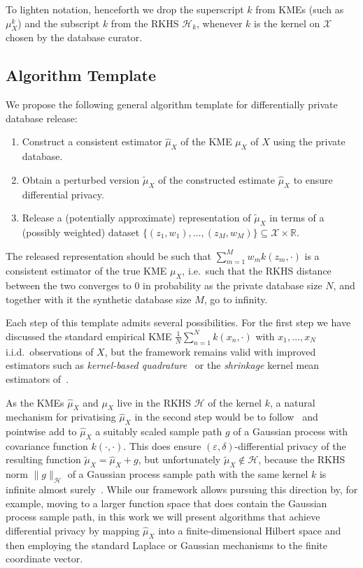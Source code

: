 \documentclass{article}
\newcommand{\calH}{\mathcal{H}}			%
\newcommand{\calX}{\mathcal{X}}			%
\newcommand{\IR}{\mathbb{R}}  			%
\theoremstyle{plain}
\theoremstyle{remark}
\theoremstyle{definition}
\begin{document}
To lighten notation, henceforth we drop the superscript $k$ from KMEs (such as $\mu_X^k$) and the subscript $k$ from the RKHS $\calH_k$, whenever $k$ is the kernel on $\calX$ chosen by the database curator.


\subsection{Algorithm Template}
\label{sec:framework:template}

We propose the following general algorithm template for differentially private database release:
\begin{enumerate}
	\item Construct a consistent estimator $\hat{\mu}_X$ of the KME $\mu_X$ of $X$ using the private database.
	\item Obtain a perturbed version $\tilde{\mu}_X$ of the constructed estimate $\hat{\mu}_X$ to ensure differential privacy.
	\item Release a (potentially approximate) representation of $\tilde{\mu}_X$ in terms of a (possibly weighted) dataset $\{ (z_1, w_1), \ldots, (z_M, w_M) \} \subseteq \calX \times \IR$.
\end{enumerate}
The released representation should be such that $\sum_{m = 1}^M w_m k(z_m, \cdot)$ is a consistent estimator of the true KME $\mu_X$, i.e.~such that the RKHS distance between the two converges to $0$ in probability as the private database size $N$, and together with it the synthetic database size $M$, go to infinity.

Each step of this template admits several possibilities. For the first step we have discussed the standard empirical KME $\frac{1}{N} \sum_{n = 1}^N k(x_n, \cdot)$ with $x_1, \ldots, x_N$ i.i.d.~observations of $X$, but the framework remains valid with improved estimators such as \emph{kernel-based quadrature}~\cite{chen_herding_2010} or the \emph{shrinkage} kernel mean estimators of~\cite{muandet_kernel_2016}.

As the KMEs $\hat{\mu}_X$ and $\mu_X$ live in the RKHS $\calH$ of the kernel $k$, a natural mechanism for privatising $\hat{\mu}_X$ in the second step would be to follow~\cite{hall_differential_2013} and pointwise add to $\hat{\mu}_X$ a suitably scaled sample path $g$ of a Gaussian process with covariance function $k(\cdot, \cdot)$. This does ensure $(\varepsilon, \delta)$-differential privacy of the resulting function $\tilde{\mu}_X = \hat{\mu}_X + g$, but unfortunately $\tilde{\mu}_X \not\in \calH$, because the RKHS norm $\| g \|_{\calH}$ of a Gaussian process sample path with the same kernel $k$ is infinite almost surely~\cite{rasmussen_gaussian_2005}. While our framework allows pursuing this direction by, for example, moving to a larger function space that does contain the Gaussian process sample path, in this work we will present algorithms that achieve differential privacy by mapping $\hat{\mu}_X$ into a finite-dimensional Hilbert space and then employing the standard Laplace or Gaussian mechanisms to the finite coordinate vector.
\end{document}
